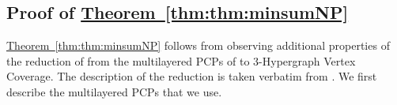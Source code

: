 \documentclass[11pt]{article}
\newcommand{\namedref}[2]{\hyperref[#2]{#1~\ref*{#2}}}
\newcommand{\thmref}[1]{\namedref{Theorem}{thm:#1}}
\newcommand{\seclab}[1]{\label{sec:#1}}
\newcommand{\calm}{\mathcal{M}}
\begin{document}
\subsection{Proof of \texorpdfstring{\thmref{thm:minsumNP}}{Theorem (Min Sum NP)}}\seclab{sec:jchdb}


\thmref{thm:minsumNP} follows from observing additional properties of the reduction of \cite{Cohen-AddadSL22} from the multilayered PCPs of \cite{DGKR05, Khot02} to $3$-Hypergraph Vertex Coverage. The description of the reduction is taken verbatim from \cite{Cohen-AddadSL22}. We first describe the multilayered PCPs that we use. 
\end{document}
